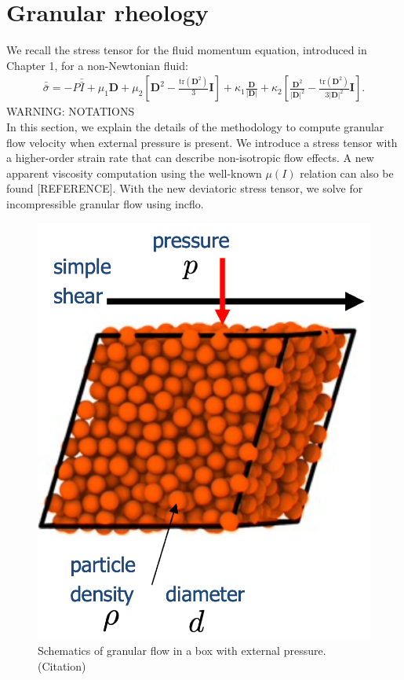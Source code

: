 \section{Granular rheology}
We recall the stress tensor for the fluid momentum equation, introduced in Chapter 1, for a non-Newtonian fluid:
\begin{align}
  \bar{\bar{\sigma}}
    = -P \bar{\bar{I}}  + \mu_1 {\bm D} 
    + \mu_2  \left[ {\bm D}^2  - \frac{\text{tr}\left({\bm D}^2\right)}{3}{\bm I} \right]
   + \kappa_1 \frac{{\bm D}}{|{\bm D}|} 
    + \kappa_2  \left[ \frac{{\bm D}^2}{|{\bm D}|^2}  
    - \frac{\text{tr}\left({\bm D}^2\right)}{3|{\bm D}|^2}{\bm I} \right].
  \end{align}
{\color{red}WARNING: NOTATIONS}
\\
In this section, we explain the details of the methodology to compute granular flow velocity when external pressure is present. We introduce a stress tensor with a higher-order strain rate that can describe non-isotropic flow effects. A new apparent viscosity computation using the well-known $\mu(I)$ relation can also be found [{\color{blue}REFERENCE}]. With the new deviatoric stress tensor, we solve for incompressible granular flow using incflo. 
\begin{figure}[ht]
  \begin{center}
    \includegraphics[scale=0.4]{figures/fig_granular_ex.png}
    \end{center}
  \caption{Schematics of granular flow in a box with external pressure.({\color{red}Citation})}
  \label{fig_Laminar_shear}
\end{figure}

